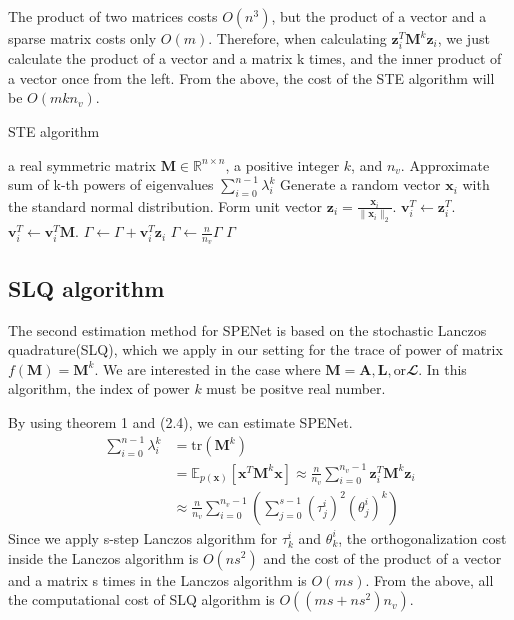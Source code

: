 \documentclass[senior,final,11pt]{iscs-thesis}
\begin{document}
The product of two matrices costs $O(n^3)$, but the product of a vector and a sparse matrix costs only $O(m)$. Therefore, when calculating $\mathbf{z}_i^{T}{\mathbf M}^k\mathbf{z}_i$, we just calculate the product of a vector and a matrix k times, and the inner product of a vector once from the left. From the above, the cost of the STE algorithm will be $O(mkn_v)$.

\begin{algorithm}
    \caption{STE algorithm}
    \begin{algorithmic}[1]
    \renewcommand{\algorithmicrequire}{\textbf{Input:}}
    \renewcommand{\algorithmicensure}{\textbf{Output:}}
    \REQUIRE a real symmetric matrix ${\mathbf M} \in {\mathbb R}^{n\times n}$, a positive integer $k$, and $n_v$.
    \ENSURE  Approximate sum of k-th powers of eigenvalues $\sum_{i=0}^{n-1} \lambda_i^k$
     \STATE Generate a random vector $\mathbf{x}_i$ with the standard normal distribution.
     \STATE Form unit vector $\mathbf{z}_i = \frac{\mathbf{x}_i}{\|\mathbf{x}_i\|_2}$.
     \STATE $\mathbf{v}_i^T \leftarrow \mathbf{z}_i^T $.
        \STATE $\mathbf{v}_i^T \leftarrow \mathbf{v}_i^T {\mathbf M}$.
        \ENDFOR
     \STATE $\Gamma \leftarrow \Gamma + \mathbf{v}_i^T \mathbf{z}_i$
     \ENDFOR
    \STATE $\Gamma \leftarrow \frac{n}{n_v}\Gamma$
    \RETURN $\Gamma$
    \end{algorithmic}
\end{algorithm}

\subsection{SLQ algorithm}
The second estimation method for SPENet is based on the stochastic Lanczos quadrature(SLQ), which we apply in our setting for the trace of power of matrix $f({\mathbf M})={\mathbf M}^k$. We are interested in the case where ${\mathbf M} = {\mathbf A}, {\mathbf L}, \text{or} {\mathbfcal L}$. In this algorithm, the index of power $k$ must be positve real number.

By using theorem 1 and (2.4), we can estimate SPENet.
\begin{align}
    \sum_{i=0}^{n-1} \lambda_i^k &= \mathrm{tr}({\mathbf M}^k)  \nonumber\\
    &= \mathbb{E}_{p(\mathbf{x})}[\mathbf{x}^{T}{\mathbf M}^k \mathbf{x}] \approx \frac{n}{n_v}\sum_{i=0}^{n_v-1} \mathbf{z}_i^{T}{\mathbf M}^k\mathbf{z}_i \nonumber\\
    &\approx \frac{n}{n_v} \sum_{i=0}^{n_v-1}\left(\sum_{j=0}^{s-1} (\tau_j^i)^2 (\theta_j^i)^k \right)
\end{align}
Since we apply s-step Lanczos algorithm for $\tau_k^i$ and $\theta_k^i$, the orthogonalization cost inside the Lanczos algorithm is $O(ns^2)$ and the cost of the product of a vector and a matrix s times in the Lanczos algorithm is $O(ms)$. From the above, all the computational cost of SLQ algorithm is $O((ms+ns^2)n_v)$.
\end{document}
